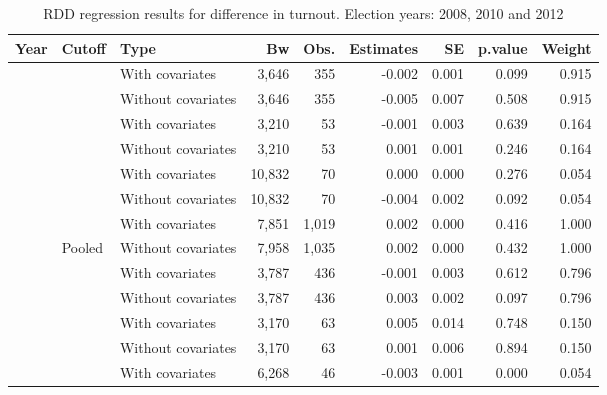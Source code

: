 \documentclass[
  12pt,
]{article}
\begin{document}
\begin{table}[H]

\caption{\label{tab:reg.part.dif}RDD regression results for difference in turnout. Election years: 2008, 2010 and 2012}
\centering
\begin{tabular}[t]{lllrrrrrr}
\toprule
Year & Cutoff & Type & Bw & Obs. & Estimates & SE & p.value & Weight\\
\midrule
 &  & With covariates & 3,646 & 355 & -0.002 & 0.001 & 0.099 & 0.915\\


 & \multirow{-2}{*}{\raggedright\arraybackslash 20000} & Without covariates & 3,646 & 355 & -0.005 & 0.007 & 0.508 & 0.915\\


 &  & With covariates & 3,210 & 53 & -0.001 & 0.003 & 0.639 & 0.164\\


 & \multirow{-2}{*}{\raggedright\arraybackslash 40000} & Without covariates & 3,210 & 53 & 0.001 & 0.001 & 0.246 & 0.164\\


 &  & With covariates & 10,832 & 70 & 0.000 & 0.000 & 0.276 & 0.054\\


 & \multirow{-2}{*}{\raggedright\arraybackslash 60000} & Without covariates & 10,832 & 70 & -0.004 & 0.002 & 0.092 & 0.054\\


 &  & With covariates & 7,851 & 1,019 & 0.002 & 0.000 & 0.416 & 1.000\\


\multirow{-8}{*}{\raggedright\arraybackslash 2008} & Pooled & Without covariates & 7,958 & 1,035 & 0.002 & 0.000 & 0.432 & 1.000\\
\cmidrule{1-9}
 &  & With covariates & 3,787 & 436 & -0.001 & 0.003 & 0.612 & 0.796\\


 & \multirow{-2}{*}{\raggedright\arraybackslash 20000} & Without covariates & 3,787 & 436 & 0.003 & 0.002 & 0.097 & 0.796\\


 &  & With covariates & 3,170 & 63 & 0.005 & 0.014 & 0.748 & 0.150\\


 & \multirow{-2}{*}{\raggedright\arraybackslash 40000} & Without covariates & 3,170 & 63 & 0.001 & 0.006 & 0.894 & 0.150\\


 &  & With covariates & 6,268 & 46 & -0.003 & 0.001 & 0.000 & 0.054\\



\end{tabular}
\end{table}
\end{document}
